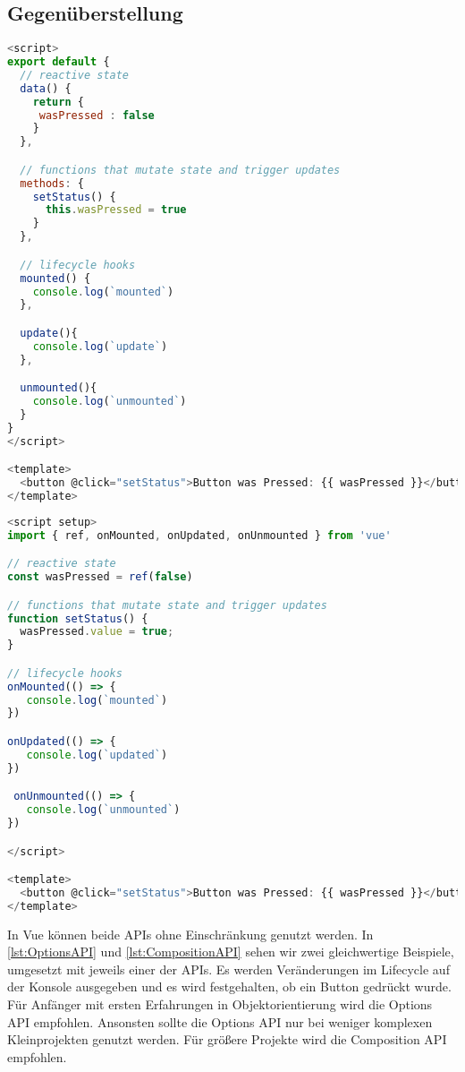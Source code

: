 \subsection*{Gegenüberstellung}

\begin{minipage}[t]{.45\textwidth}
    \begin{lstlisting}[caption={Options API},language=javascript, label={lst:OptionsAPI}]
<script>
export default {
  // reactive state
  data() {
    return {
     wasPressed : false
    }
  },

  // functions that mutate state and trigger updates
  methods: {
    setStatus() {
      this.wasPressed = true
    }
  },

  // lifecycle hooks
  mounted() {
    console.log(`mounted`)
  },

  update(){
    console.log(`update`)
  },

  unmounted(){
    console.log(`unmounted`)
  }
}
</script>

<template>
  <button @click="setStatus">Button was Pressed: {{ wasPressed }}</button>
</template>
    \end{lstlisting}
\end{minipage}%
\hspace{1cm}
\begin{minipage}[t]{.5\textwidth}
    \begin{lstlisting}[caption={Composition API},language=javascript, label={lst:CompositionAPI}]
<script setup>
import { ref, onMounted, onUpdated, onUnmounted } from 'vue'

// reactive state
const wasPressed = ref(false)

// functions that mutate state and trigger updates
function setStatus() {
  wasPressed.value = true;
}

// lifecycle hooks
onMounted(() => {
   console.log(`mounted`)
})

onUpdated(() => {
   console.log(`updated`)
})

 onUnmounted(() => {
   console.log(`unmounted`)
})

</script>

<template>
  <button @click="setStatus">Button was Pressed: {{ wasPressed }}</button>
</template>
    \end{lstlisting}
\end{minipage}

In Vue können beide APIs ohne Einschränkung genutzt werden.
In \ref{lst:OptionsAPI} und \ref{lst:CompositionAPI} sehen wir zwei gleichwertige
Beispiele, umgesetzt mit jeweils einer der APIs.
Es werden Veränderungen im Lifecycle auf der Konsole ausgegeben und es wird festgehalten, ob ein Button gedrückt wurde.
Für Anfänger mit ersten Erfahrungen in Objektorientierung wird die Options API empfohlen.
Ansonsten sollte die Options API nur bei weniger komplexen Kleinprojekten genutzt werden.
Für größere Projekte wird die Composition API empfohlen. \cite{vueIntroduction}

